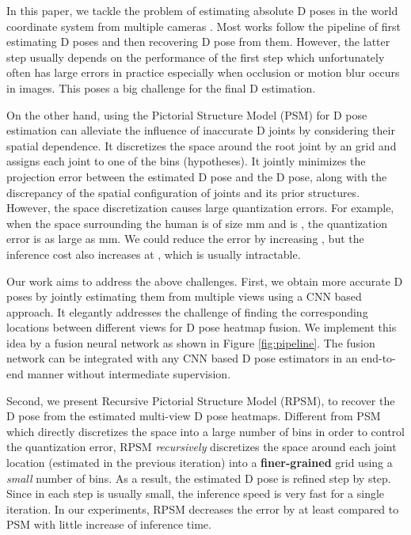 \documentclass[10pt,twocolumn,letterpaper]{article}
\begin{document}
In this paper, we tackle the problem of estimating absolute D poses in the world coordinate system from multiple cameras \cite{amin2013multi,liu2011markerless,burenius20133D,PavlakosZDD17,belagiannis20143D,rhodin2018learning}. Most works follow the pipeline of first estimating D poses and then recovering D pose from them. However, the latter step usually depends on the performance of the first step which unfortunately often has large errors in practice especially when occlusion or motion blur occurs in images. This poses a big challenge for the final D estimation. 

On the other hand, using the Pictorial Structure Model (PSM) \cite{kostrikov2014depth,PavlakosZDD17,belagiannis20143D} for D pose estimation can alleviate the influence of inaccurate D joints by considering their spatial dependence. It discretizes the space around the root joint by an  grid and assigns each joint to one of the  bins (hypotheses). It jointly minimizes the projection error between the estimated D pose and the D pose, along with the discrepancy of the spatial configuration of joints and its prior structures. However, the space discretization causes large quantization errors. For example, when the space surrounding the human is of size mm and  is , the quantization error is as large as mm. We could reduce the error by increasing , but the inference cost also increases at , which is usually intractable. 



Our work aims to address the above challenges. First, we obtain more accurate D poses by jointly estimating them from multiple views using a CNN based approach. It elegantly addresses the challenge of finding the corresponding locations between different views for D pose heatmap fusion. We implement this idea by a fusion neural network as shown in Figure \ref{fig:pipeline}. The fusion network can be integrated with any CNN based D pose estimators in an end-to-end manner without intermediate supervision.

Second, we present Recursive Pictorial Structure Model (RPSM), to recover the D pose from the estimated multi-view D pose heatmaps. Different from PSM which directly discretizes the space into a large number of bins in order to control the quantization error, RPSM \textit{recursively} discretizes the space around each joint location (estimated in the previous iteration) into a \textbf{finer-grained} grid using a \textit{small} number of bins. As a result, the estimated D pose is refined step by step.  Since  in each step is usually small, the inference speed is very fast for a single iteration. In our experiments, RPSM decreases the error by at least  compared to PSM with little increase of inference time.
\end{document}
